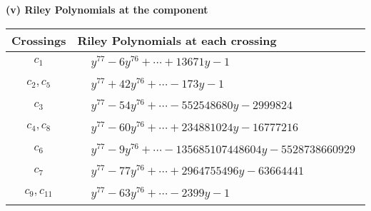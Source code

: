 \documentclass[1p]{elsarticle_modified}
\theoremstyle{definition}
\begin{document}
\newpage\renewcommand{\arraystretch}{1}
\flushleft \textbf{(v) Riley Polynomials at the component}\newline \\
\begin{tabular}{m{50pt}|m{274pt}}
Crossings & \hspace{64pt}Riley Polynomials at each crossing \\
\hline $$\begin{aligned}c_{1}\end{aligned}$$&$\begin{aligned}
&y^{77}-6 y^{76}+\cdots+13671 y-1
\end{aligned}$\\
\hline $$\begin{aligned}c_{2},c_{5}\end{aligned}$$&$\begin{aligned}
&y^{77}+42 y^{76}+\cdots-173 y-1
\end{aligned}$\\
\hline $$\begin{aligned}c_{3}\end{aligned}$$&$\begin{aligned}
&y^{77}-54 y^{76}+\cdots-552548680 y-2999824
\end{aligned}$\\
\hline $$\begin{aligned}c_{4},c_{8}\end{aligned}$$&$\begin{aligned}
&y^{77}-60 y^{76}+\cdots+234881024 y-16777216
\end{aligned}$\\
\hline $$\begin{aligned}c_{6}\end{aligned}$$&$\begin{aligned}
&y^{77}-9 y^{76}+\cdots-135685107448604 y-5528738660929
\end{aligned}$\\
\hline $$\begin{aligned}c_{7}\end{aligned}$$&$\begin{aligned}
&y^{77}-77 y^{76}+\cdots+2964755496 y-63664441
\end{aligned}$\\
\hline $$\begin{aligned}c_{9},c_{11}\end{aligned}$$&$\begin{aligned}
&y^{77}-63 y^{76}+\cdots-2399 y-1
\end{aligned}$\\

\end{tabular}
\end{document}
